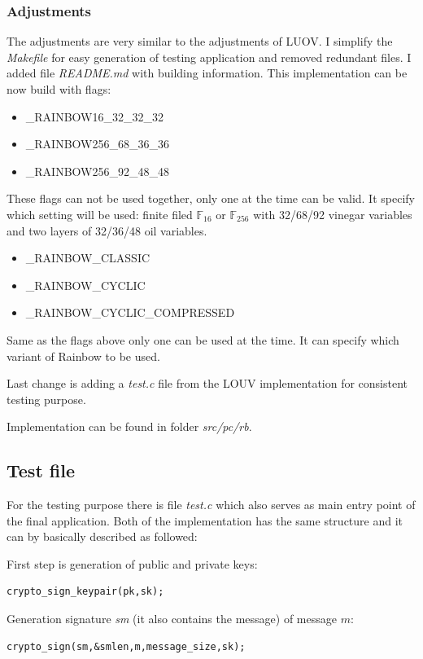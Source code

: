 \documentclass[thesis=M,english]{FITthesis}[2019/12/23]
\begin{document}
\subsubsection{Adjustments}
The adjustments are very similar to the adjustments of LUOV. I simplify the \textit{Makefile} for easy generation of testing application and removed redundant files. I added file \textit{README.md} with building information. This implementation can be now build with flags:

\begin{itemize}
\item	\_RAINBOW16\_32\_32\_32 
\item	\_RAINBOW256\_68\_36\_36 
\item	\_RAINBOW256\_92\_48\_48 
\end{itemize}
These flags can not be used together, only one at the time can be valid. It specify which setting will be used: finite filed $\mathbb{F}_{16}$ or $\mathbb{F}_{256}$ with 32/68/92 vinegar variables and two layers of 32/36/48 oil variables.

\begin{itemize}
\item	\_RAINBOW\_CLASSIC  
\item	\_RAINBOW\_CYCLIC 
\item	\_RAINBOW\_CYCLIC\_COMPRESSED 
\end{itemize}
Same as the flags above only one can be used at the time. It can specify which variant of Rainbow to be used.

\bigskip
\noindent
Last change is adding a \textit{test.c} file from the LOUV implementation for consistent testing purpose.

\bigskip
\noindent
Implementation can be found in folder \textit{src/pc/rb}.  

\subsection{Test file}
For the testing purpose there is file \textit{test.c} which also serves as main entry point of the final application. Both of the implementation has the same structure and it can by basically described as followed:

\bigskip
\noindent
First step is generation of public and private keys:
\begin{lstlisting}[frame=single]
crypto_sign_keypair(pk,sk);
\end{lstlisting}

\bigskip
\noindent
Generation signature \textit{sm} (it also contains the message) of message $m$:
\begin{lstlisting}[frame=single]
crypto_sign(sm,&smlen,m,message_size,sk);
\end{lstlisting}
\end{document}
